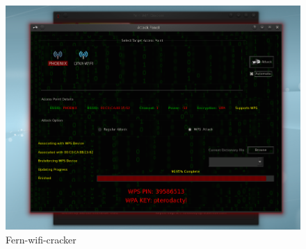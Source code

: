 \begin{figure}[ht]
    \centering
    \includegraphics[width=\linewidth]{Immagini/6/fern_3.jpg}
    \caption{Fern-wifi-cracker}
    \label{fig:Fern example}
\end{figure}

\label{chap:conc}
